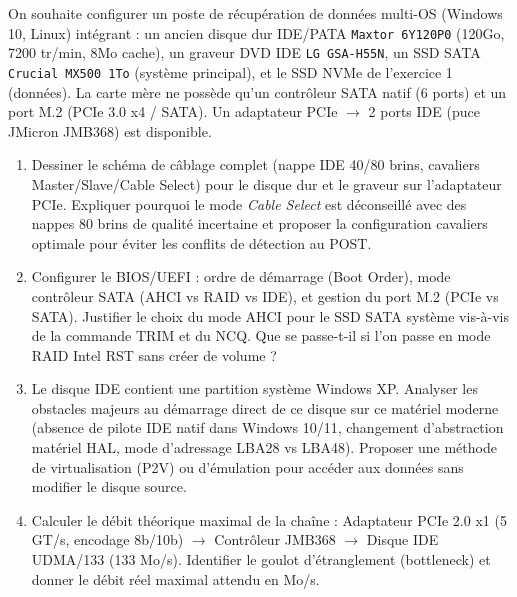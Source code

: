\documentclass[11pt]{article}
\begin{document}
\begin{exercice}
On souhaite configurer un poste de récupération de données multi-OS (Windows 10, Linux) intégrant : un ancien disque dur IDE/PATA \texttt{Maxtor 6Y120P0} (120Go, 7200 tr/min, 8Mo cache), un graveur DVD IDE \texttt{LG GSA-H55N}, un SSD SATA \texttt{Crucial MX500 1To} (système principal), et le SSD NVMe de l'exercice 1 (données). La carte mère ne possède qu'un contrôleur SATA natif (6 ports) et un port M.2 (PCIe 3.0 x4 / SATA). Un adaptateur PCIe $\to$ 2 ports IDE (puce JMicron JMB368) est disponible.
\begin{enumerate}
    \item Dessiner le schéma de câblage complet (nappe IDE 40/80 brins, cavaliers Master/Slave/Cable Select) pour le disque dur et le graveur sur l'adaptateur PCIe. Expliquer pourquoi le mode \textit{Cable Select} est déconseillé avec des nappes 80 brins de qualité incertaine et proposer la configuration cavaliers optimale pour éviter les conflits de détection au POST.
    \item Configurer le BIOS/UEFI : ordre de démarrage (Boot Order), mode contrôleur SATA (AHCI vs RAID vs IDE), et gestion du port M.2 (PCIe vs SATA). Justifier le choix du mode AHCI pour le SSD SATA système vis-à-vis de la commande TRIM et du NCQ. Que se passe-t-il si l'on passe en mode RAID Intel RST sans créer de volume ?
    \item Le disque IDE contient une partition système Windows XP. Analyser les obstacles majeurs au démarrage direct de ce disque sur ce matériel moderne (absence de pilote IDE natif dans Windows 10/11, changement d'abstraction matériel HAL, mode d'adressage LBA28 vs LBA48). Proposer une méthode de virtualisation (P2V) ou d'émulation pour accéder aux données sans modifier le disque source.
    \item Calculer le débit théorique maximal de la chaîne : Adaptateur PCIe 2.0 x1 (5 GT/s, encodage 8b/10b) $\to$ Contrôleur JMB368 $\to$ Disque IDE UDMA/133 (133 Mo/s). Identifier le goulot d'étranglement (bottleneck) et donner le débit réel maximal attendu en Mo/s.
\end{enumerate}
\end{exercice}
\end{document}
